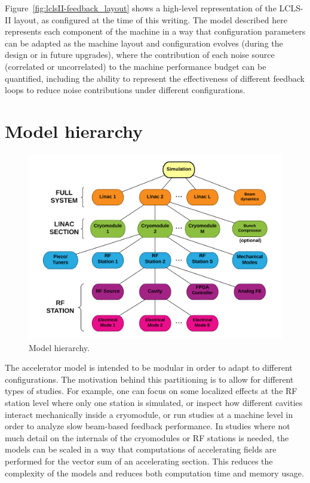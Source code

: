 \documentclass[a4paper,12pt]{article}
\begin{document}
Figure~\ref{fig:lclsII-feedback_layout} shows a high-level representation of the LCLS-II layout, as configured at the time of this writing. The model described here represents each component of the machine in a way that configuration parameters can be adapted as the machine layout and configuration evolves (during the design or in future upgrades), where the contribution of each noise source (correlated or uncorrelated) to the machine performance budget can be quantified, including the ability to represent the effectiveness of different feedback loops to reduce noise contributions under different configurations.

\section{Model hierarchy}

\begin{figure}
\centering
\includegraphics[scale=0.6]{../figures/Model_hierarchy.png}
\caption{Model hierarchy.}
\label{fig:model_hierarchy}
\end{figure}

The accelerator model is intended to be modular in order to adapt to different configurations. The motivation behind this partitioning is to allow for different types of studies. For example, one can focus on some localized effects at the RF station level where only one station is simulated, or inspect how different cavities interact mechanically inside a cryomodule, or run studies at a machine level in order to analyze slow beam-based feedback performance. In studies where not much detail on the internals of the cryomodules or RF stations is needed, the models can be scaled in a way that computations of accelerating fields are performed for the vector sum of an accelerating section. This reduces the complexity of the models and reduces both computation time and memory usage.
\end{document}
